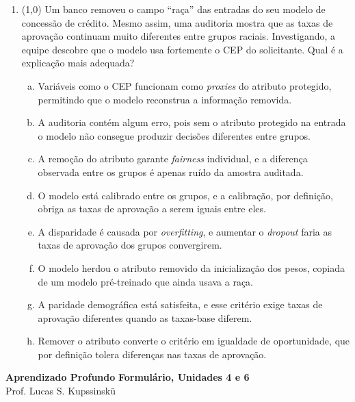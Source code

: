 \documentclass[11pt,a4paper]{article}
\newcommand{\bloco}[1]{%
  \par\vspace{0.3em}%
  {\bfseries\large #1}\par%
  \vspace{-0.4em}{\color{gray!60}\rule{\linewidth}{0.4pt}}\par%
}
\begin{document}
\begin{enumerate}[1)]
\pagebreak
\item (1{,}0) Um banco removeu o campo ``raça'' das entradas do seu modelo de concessão de crédito. Mesmo assim, uma auditoria mostra que as taxas de aprovação continuam muito diferentes entre grupos raciais. Investigando, a equipe descobre que o modelo usa fortemente o CEP do solicitante. Qual é a explicação mais adequada?

\begin{enumerate}[a)]
    \item Variáveis como o CEP funcionam como \textit{proxies} do atributo protegido, permitindo que o modelo reconstrua a informação removida.
    \item A auditoria contém algum erro, pois sem o atributo protegido na entrada o modelo não consegue produzir decisões diferentes entre grupos.
    \item A remoção do atributo garante \textit{fairness} individual, e a diferença observada entre os grupos é apenas ruído da amostra auditada.
    \item O modelo está calibrado entre os grupos, e a calibração, por definição, obriga as taxas de aprovação a serem iguais entre eles.
    \item A disparidade é causada por \textit{overfitting}, e aumentar o \textit{dropout} faria as taxas de aprovação dos grupos convergirem.
    \item O modelo herdou o atributo removido da inicialização dos pesos, copiada de um modelo pré-treinado que ainda usava a raça.
    \item A paridade demográfica está satisfeita, e esse critério exige taxas de aprovação diferentes quando as taxas-base diferem.
    \item Remover o atributo converte o critério em igualdade de oportunidade, que por definição tolera diferenças nas taxas de aprovação.
\end{enumerate}

\end{enumerate}

\renewcommand{\bloco}[1]{\par\vspace{0.1em}{\bfseries\normalsize #1}\par\vspace{-0.6em}{\color{gray!60}\rule{\linewidth}{0.4pt}}\par}
\footnotesize
\setlength{\parskip}{0.25em}
\setlength{\abovedisplayskip}{3pt}\setlength{\belowdisplayskip}{3pt}
{\Large\bfseries Aprendizado Profundo} \hfill \textbf{Formulário, Unidades 4 e 6}\\
Prof. Lucas S. Kupssinskü
\end{document}
